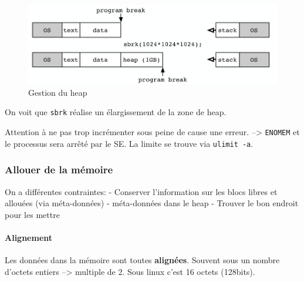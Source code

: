 \begin{figure}
\centering
\includegraphics{image-48.png}
\caption{Gestion du heap}
\end{figure}

On voit que \texttt{sbrk} réalise un élargissement de la zone de heap.

\begin{Shaded}
\begin{Highlighting}[]
\PreprocessorTok{ }

\OperatorTok{(} \OperatorTok{*}\OperatorTok{);}            
 \OperatorTok{*}\OperatorTok{(}\OperatorTok{);} 
\end{Highlighting}
\end{Shaded}

Attention à ne pas trop incrémenter sous peine de cause une erreur.
--\textgreater{} \texttt{ENOMEM} et le processus sera arrêté par le SE.
La limite se trouve via \texttt{ulimit\ -a}.

\subsubsection{Allouer de la mémoire}\label{allouer-de-la-muxe9moire}

On a différentes contraintes: - Conserver l'information sur les blocs
libres et allouées (via méta-données) - méta-données dans le heap -
Trouver le bon endroit pour les mettre

\paragraph{Alignement}\label{alignement}

Les données dans la mémoire sont toutes \textbf{alignées}. Souvent sous
un nombre d'octets entiers --\textgreater{} multiple de 2. Sous linux
c'est 16 octets (128bits).


